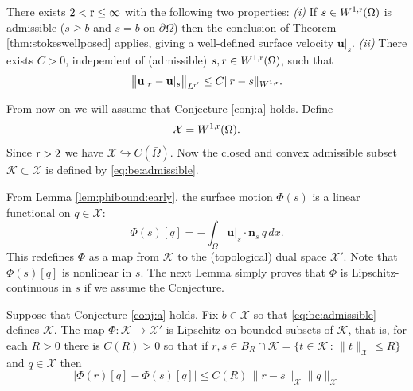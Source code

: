 \documentclass[hidelinks,onefignum,onetabnum,final]{siamart220329}  %
\newcommand{\bn}{\mathbf{n}}
\newcommand{\bu}{\mathbf{u}}
\newcommand{\cK}{\mathcal{K}}
\newcommand{\cX}{\mathcal{X}}
\newcommand{\rr}{{\text{\textnormal{r}}}}
\begin{document}
\begin{conjecture} \label{conj:a}

\noindent There exists $2 < \rr \le \infty$ with the following two properties:  \emph{(i)} If $s\in W^{1,\rr}(\Omega)$ is admissible ($s\ge b$ and $s=b$ on $\partial\Omega$) then the conclusion of Theorem \ref{thm:stokeswellposed} applies, giving a well-defined surface velocity $\bu|_s$.  \emph{(ii)} There exists $C>0$, independent of (admissible) $s,r\in W^{1,\rr}(\Omega)$, such that
\begin{equation}
\big\|\bu|_r - \bu|_s\big\|_{L^{\rr'}} \le C \|r-s\|_{W^{1,\rr}}. \label{eq:ulipschitz}
\end{equation}
\end{conjecture}

From now on we will assume that Conjecture \ref{conj:a} holds.  Define
\begin{equation}
\cX = W^{1,\rr}(\Omega). \label{eq:defineX}
\end{equation}
Since $\rr>2$ we have $\cX \hookrightarrow C(\bar\Omega)$.  Now the closed and convex admissible subset $\cK \subset \cX$ is defined by \eqref{eq:be:admissible}.

From Lemma \ref{lem:phibound:early}, the surface motion $\Phi(s)$ is a linear functional on $q \in \cX$:
\begin{equation}
\Phi(s)[q] = -\int_\Omega \bu|_s\cdot\bn_s\,q\,dx. \label{eq:definePhi}
\end{equation}
This redefines $\Phi$ as a map from $\cK$ to the (topological) dual space $\cX'$.  Note that $\Phi(s)[q]$ is nonlinear in $s$.  The next Lemma simply proves that $\Phi$ is Lipschitz-continuous in $s$ if we assume the Conjecture.

\begin{lemma} \label{lem:philipschitz}  Suppose that Conjecture \ref{conj:a} holds.  Fix $b \in \cX$ so that \eqref{eq:be:admissible} defines $\cK$.  The map $\Phi:\cK\to\cX'$ is Lipschitz on bounded subsets of $\cK$, that is, for each $R>0$ there is $C(R)>0$ so that if $r,s\in B_R \cap \cK = \{t\in \cK\,:\,\|t\|_{\cX} \le R\}$ and $q\in\cX$ then
\begin{equation}
\Big|\Phi(r)[q] - \Phi(s)[q]\Big| \le C(R)\, \|r-s\|_{\cX} \|q\|_{\cX}  \label{eq:philipschitz}
\end{equation}
\end{lemma}
\end{document}
